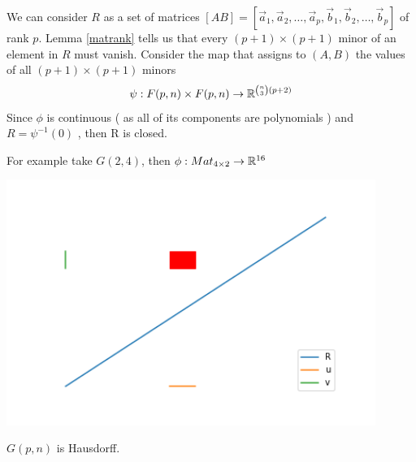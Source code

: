 \documentclass[11pt,a4paper]{report}
\begin{document}
We can consider $R$ as a set of matrices $[A B] = [\vec{a}_1, \vec{a}_2, \dots, \vec{a}_p, \vec{b}_1, \vec{b}_2, \dots , \vec{b}_p]$ of rank $p$.
Lemma \ref{matrank} tells us that every $(p+1) \times (p+1) $ minor of an element in $R$ must vanish. Consider the map that assigns to $(A,B)$ the values of all $ (p+1) \times (p+1) $ minors
$$ \psi:  F(p,n) \times F(p,n) \to \mathbb{R}^{ {n \choose 3} (p+2) }$$
Since $\phi$ is continuous ( as all of its components are polynomials )  and $R = \psi^{-1} (0) $ , then R is closed.
\begin{Ex}
    For example take $G(2,4)$, then $\phi: Mat_{4 \times 2} \to \mathbb{R}^{16}$ 
\end{Ex}
\begin{center}
      \centering
      \includegraphics[width=0.90\textwidth]{graph_int.png}
\end{center}

\begin{Prop}
$G(p,n)$ is Hausdorff.
\end{Prop}
\end{document}
